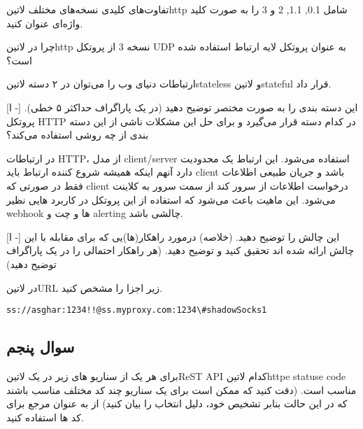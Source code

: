 \documentclass{../assignment}
\title{\lr{HTTP}}
\begin{document}
\maketitle

\tableofcontents
\newpage



تفاوت‌های کلیدی نسخه‌های مختلف ‌لاتین{http} شامل 0.1, 1.1, 2 و 3 را به صورت کلید واژه‌ای عنوان کنید.

چرا در ‌لاتین{http} نسخه 3 از پروتکل UDP به عنوان پروتکل لایه ارتباط استفاده شده است؟


ارتباطات دنیای وب را می‌توان در ۲ دسته ‌لاتین{stateless} و ‌لاتین{stateful} قرار داد.

[ا -]
 این دسته بندی را به صورت مختصر توضیح دهید (در یک پاراگراف حداکثر ۵ خطی).
 پروتکل HTTP در کدام دسته قرار می‌گیرد و برای حل این مشکلات ناشی از این دسته بندی از چه روشی استفاده می‌کند؟


در ارتباطات HTTP، از مدل client/server استفاده می‌شود. این ارتباط یک محدودیت دارد آنهم اینکه همیشه شروع کننده ارتباط باید client باشد و جریان طبیعی اطلاعات فقط در صورتی که client درخواست اطلاعات از سرور کند از سمت سرور به کلاینت می‌شود. این ماهیت باعث می‌شود که استفاده از این پروتکل در کاربرد هایی نظیر webhook ها و چت و alerting چالشی باشد.

[ا -]
 این چالش را توضیح دهید. (خلاصه)
 درمورد راهکار(ها)یی که برای مقابله با این چالش ارائه شده اند تحقیق کنید و توضیح دهید. (هر راهکار احتمالی را در یک پاراگراف توضیح دهید)


در ‌لاتین{URL} زیر اجزا را مشخص کنید.

\begin{latin}
\begin{verbatim}
ss://asghar:1234!!@ss.myproxy.com:1234\#shadowSocks1
\end{verbatim}
\end{latin}

\subsection{سوال پنجم}
برای هر یک از سناریو های زیر در یک ‌لاتین{ReST API} کدام ‌لاتین{httpe statuse code} مناسب است.
(دقت کنید که ممکن است برای یک سناریو چند کد مختلف مناسب باشند که در این حالت بنابر تشخیص خود، دلیل انتخاب را بیان کنید)
از  به عنوان مرجع برای کد ها استفاده کنید.
\end{document}

